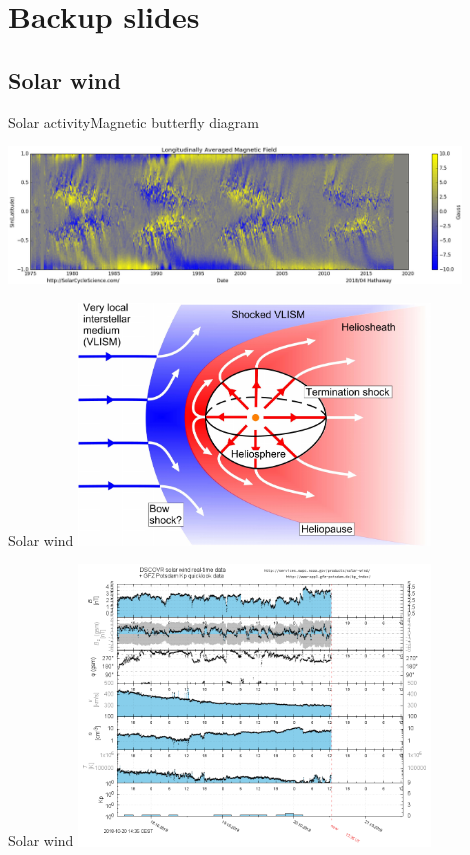 \appendix


\section{Backup slides}

\subsection{Solar wind}

\begin{frame}[c,label=butterfly]{Solar activity}{Magnetic butterfly diagram}
	
	\centering
	\includegraphics[width=0.9\textwidth]{../figures_of_others/images/Hathaway_magbfly_201804_cropped.png}
\end{frame}
\begin{frame}[c]{Solar wind}{}
	\includegraphics[width=0.7\textwidth]{../figures_of_others/images/Owens2013_Heliosphere_screenshot.png}
\end{frame}
\begin{frame}[c]{Solar wind}{}
	\includegraphics[width=0.7\textwidth]{../talk_figures/ace_realtime_ap_plot.png}
\end{frame}

